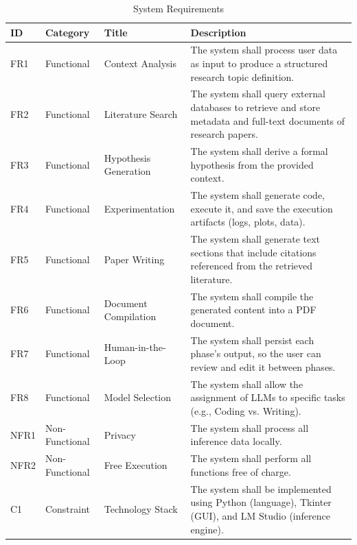 \begin{table}[htbp]
    \centering
    \caption{System Requirements}
    \label{tab:requirements}
    \begin{tabularx}{\textwidth}{l p{2cm} p{3cm} X}
        \toprule
        \textbf{ID} & \textbf{Category} & \textbf{Title} & \textbf{Description} \\
        \midrule
        FR1 & Functional & Context Analysis & The system shall process user data as input to produce a structured research topic definition. \\
        FR2 & Functional & Literature Search & The system shall query external databases to retrieve and store metadata and full-text documents of research papers. \\
        FR3 & Functional & Hypothesis \newline Generation & The system shall derive a formal hypothesis from the provided context. \\
        FR4 & Functional & Experimentation & The system shall generate code, execute it, and save the execution artifacts (logs, plots, data). \\
        FR5 & Functional & Paper Writing & The system shall generate text sections that include citations referenced from the retrieved literature. \\
        FR6 & Functional & Document \newline Compilation & The system shall compile the generated content into a PDF document. \\
        FR7 & Functional & Human-in-the-Loop & The system shall persist each phase's output, so the user can review and edit it between phases. \\
        FR8 & Functional & Model Selection & The system shall allow the assignment of LLMs to specific tasks (e.g., Coding vs. Writing). \\
        NFR1 & Non-\newline Functional & Privacy & The system shall process all inference data locally. \\
        NFR2 & Non-\newline Functional & Free Execution & The system shall perform all functions free of charge. \\
        C1 & Constraint & Technology Stack & The system shall be implemented using Python (language), Tkinter (GUI), and LM Studio (inference engine). \\
        \bottomrule
    \end{tabularx}
\end{table}

